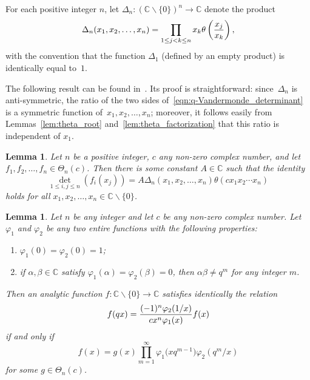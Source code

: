 \documentclass[10pt,a4paper]{amsart}
\numberwithin{equation}{section}
\newtheorem{Lemma}[Theorem]{Lemma}
\newcommand{\C}{\mathbb{C}}
\begin{document}
\begin{Definition}
For each positive integer $n$, let $\Delta_n\colon (\C \backslash \{0\})^n \rightarrow \C$ denote the product
\[ \Delta_n(x_1,x_2,\dots,x_n) = \prod_{1 \leq j < k \leq n} x_k \theta\left( {x_j \over x_k} \right), \]
with the convention that the function $\Delta_1$ (defined by an empty product) is identically equal to~$1$.
\end{Definition}

The following result can be found in~\cite[Proposition~3.4]{Rosengren2006}. Its proof is straightforward: since~$\Delta_n$ is anti-symmetric, the ratio of the two sides of~\eqref{eqn:q-Vandermonde_determinant} is a symmetric function of~$x_1, x_2, \allowbreak\dots, x_n$; moreover, it follows easily from Lemmas~\ref{lem:theta_root} and~\ref{lem:theta_factorization} that this ratio is independent of $x_1$.

\begin{Lemma} \label{lem:theta_determinant_lemma}
Let $n$ be a positive integer, $c$ any non-zero complex number, and let $f_1,f_2,\dots,f_n\allowbreak \in \Theta_n(c)$. Then there is some constant $A \in \C$ such that the identity
\begin{equation} \label{eqn:q-Vandermonde_determinant}
\det_{1 \leq i,j \leq n}(f_i(x_j))
= A \Delta_n(x_1,x_2,\dots,x_n) \theta(cx_1x_2 \cdots x_n)
\end{equation}
holds for all $x_1,x_2,\dots,x_n \in \C \backslash\{0\}$.
\end{Lemma}

\begin{Lemma} \label{lem:homogeneous_first-order_q-difference_solution}
Let $n$ be any integer and let $c$ be any non-zero complex number. Let $\varphi_1$ and $\varphi_2$ be any two entire functions with the following properties:
\begin{enumerate}\itemsep=0pt
\item[$(i)$] $\varphi_1(0)=\varphi_2(0)=1$;
\item[$(ii)$] %
if $\alpha,\beta \in \C$ satisfy $\varphi_1(\alpha)=\varphi_2(\beta)=0$, then $\alpha \beta \neq q^m$ for any integer $m$.
\end{enumerate}
Then an analytic function $f\colon\C\backslash\{0\}\rightarrow\C$ satisfies identically the relation
\begin{equation} \label{eqn:homogeneous_first-order_q-difference}
f(qx) = {(-1)^n \varphi_2(1/x) \over cx^n \varphi_1(x)} f(x)
\end{equation}
if and only if
\begin{equation} \label{eqn:homogeneous_first-order_q-difference_solution}
f(x) = g(x) \prod_{m=1}^\infty \varphi_1\bigl(xq^{m-1}\bigr) \varphi_2(q^m/x)
\end{equation}
for some $g \in \Theta_n(c)$.
\end{Lemma}
\end{document}
